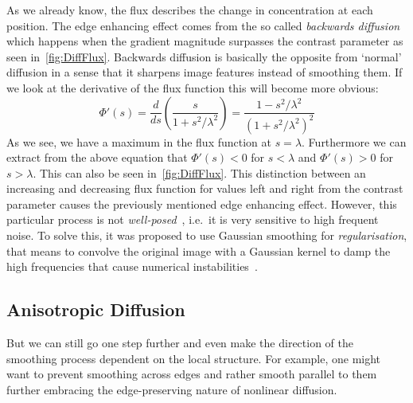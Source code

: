 As we already know, the flux describes the change in concentration at each position. The edge
enhancing effect comes from the so called \textit{backwards diffusion} which happens when the
gradient magnitude surpasses the contrast parameter as seen in~\ref{fig:DiffFlux}. Backwards
diffusion is basically the opposite from `normal' diffusion in a sense that it sharpens image
features instead of smoothing them.
If we look at the derivative of the flux function this will become more obvious:
\begin{equation}
    \Phi'(s) = \frac{d}{ds} \left(\frac{s}{1 + s^2/\lambda^2}\right) = 
    \frac{1 - s^2/\lambda^2}{{\left(1 + s^2/\lambda^2\right)}^2}
\end{equation}
As we see, we have a maximum in the flux function at $s = \lambda$. Furthermore we can extract from
the above equation that $\Phi'(s) < 0$ for $s < \lambda$ and $\Phi'(s) > 0$ for $s > \lambda$. This
can also be seen in~\ref{fig:DiffFlux}. This distinction between an increasing and decreasing flux
function for values left and right from the contrast parameter causes the previously mentioned
edge enhancing effect.
However, this particular process is not \textit{well-posed}~\cite{weickert96}, i.e.\ it is very
sensitive to high frequent noise. To solve this, it was proposed to use Gaussian smoothing for
\textit{regularisation}, that means to convolve the original image with a Gaussian kernel to damp the high
frequencies that cause numerical instabilities~\cite{catte-lions-morel92}.

\subsection{Anisotropic Diffusion}
But we can still go one step further and even make the direction of the smoothing process dependent
on the local structure. For example, one might want to prevent smoothing across edges and rather
smooth parallel to them further embracing the edge-preserving nature of nonlinear diffusion.

